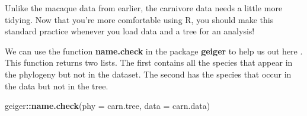 \documentclass[
]{book}
\newenvironment{Shaded}{\begin{snugshade}}{\end{snugshade}}
\newcommand{\DataTypeTok}[1]{\textcolor[rgb]{0.13,0.29,0.53}{#1}}
\newcommand{\KeywordTok}[1]{\textcolor[rgb]{0.13,0.29,0.53}{\textbf{#1}}}
\newcommand{\NormalTok}[1]{#1}
\newcommand{\OperatorTok}[1]{\textcolor[rgb]{0.81,0.36,0.00}{\textbf{#1}}}
\begin{document}
Unlike the macaque data from earlier, the carnivore data needs a little more tidying. Now that you're more comfortable using R, you should make this standard practice whenever you load data and a tree for an analysis!

We can use the function \textbf{name.check} in the package \textbf{geiger} to help us out here \citep{geiger}. This function returns two lists. The first contains all the species that appear in the phylogeny but not in the dataset. The second has the species that occur in the data but not in the tree.

\begin{Shaded}
\begin{Highlighting}[]
\NormalTok{geiger}\OperatorTok{::}\KeywordTok{name.check}\NormalTok{(}\DataTypeTok{phy =}\NormalTok{ carn.tree, }\DataTypeTok{data =}\NormalTok{ carn.data)}
\end{Highlighting}
\end{Shaded}
\end{document}
